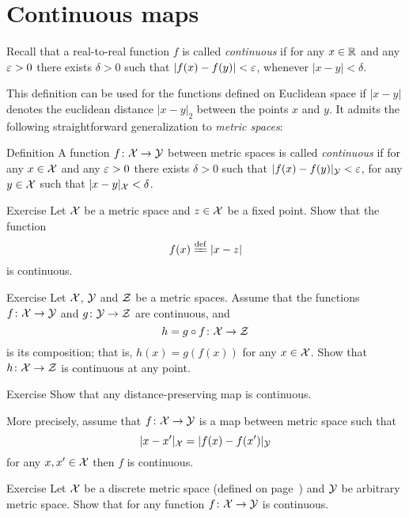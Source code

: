 \section{Continuous maps}

Recall that a real-to-real function $f$ is called \emph{continuous} 
if for any $x\in \mathbb{R}$ and any $\varepsilon > 0$ there exists $\delta > 0$ such that $|f(x)-f(y)|<\varepsilon$, whenever $|x-y|<\delta$. 

This definition can be used for the functions defined on Euclidean space if $|x-y|$ denotes the euclidean distance $|x-y|_2$ between the points $x$ and $y$.
It admits the following straightforward generalization to \emph{metric spaces}:

\begin{thm}{Definition}\label{def:cont-epsilon-delta}
A function $f\colon\mathcal{X}\to\mathcal{Y}$ between metric spaces is called \emph{continuous} 
if for any  $x\in \mathcal{X}$ and any $\varepsilon>0$ there exists $\delta>0$ such that 
$|f(x)-f(y)|_{\mathcal{Y}}<\varepsilon$,
for any
$y\in \mathcal{X}$
such that
$|x-y|_{\mathcal{X}}<\delta$.
\end{thm}

\begin{thm}{Exercise}\label{ex:dist-cont}
Let $\mathcal{X}$ be a metric space and $z\in \mathcal{X}$ be a fixed point.
Show that the function 
$$f(x)\df|x-z|$$ 
is continuous.
\end{thm}

\begin{thm}{Exercise}\label{ex:comp+cont}
Let $\mathcal{X}$, $\mathcal{Y}$ and $\mathcal{Z}$ be a metric spaces.
Assume that the functions $f\colon\mathcal{X}\to\mathcal{Y}$
and $g\colon\mathcal{Y}\to\mathcal{Z}$ are continuous,
and 
\[h=g\circ f\colon\mathcal{X}\to \mathcal{Z}\] is its composition;
that is, $h(x)=g(f(x))$ for any $x\in \mathcal{X}$.
Show that $h\colon\mathcal{X}\to\mathcal{Z}$ is continuous at any point.
\end{thm}

\begin{thm}{Exercise}\label{ex:isom-cont}
Show that any distance-preserving map is continuous.

More precisely, assume that $f\colon\mathcal{X}\to\mathcal{Y}$ is a map between metric space such that
\[|x-x'|_{\mathcal X}=
|f(x)-f(x')|_{\mathcal Y}\]
for any $x,x'\in \mathcal{X}$ then 
$f$ is continuous.
\end{thm}

\begin{thm}{Exercise}\label{ex:to-descrete}
Let $\mathcal{X}$ be a discrete metric space (defined on page~\pageref{page:Discrete metric})
and $\mathcal{Y}$ be arbitrary metric space.
Show that for any function $f\colon\mathcal{X}\to\mathcal{Y}$ is continuous.
\end{thm}



